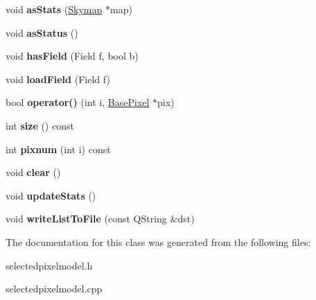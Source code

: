 \begin{DoxyCompactItemize}
\item 
\hypertarget{classSelectedPixelModel_addf41ff364fd45d5722afb7de6f5f29d}{
void {\bfseries asStats} (\hyperlink{classSkymap}{Skymap} $\ast$map)}
\label{classSelectedPixelModel_addf41ff364fd45d5722afb7de6f5f29d}

\item 
\hypertarget{classSelectedPixelModel_a06ae43060ce7a65f898454bd20181c96}{
void {\bfseries asStatus} ()}
\label{classSelectedPixelModel_a06ae43060ce7a65f898454bd20181c96}

\item 
\hypertarget{classSelectedPixelModel_a5dc32e7fcbfc6df118467e70cae393a8}{
void {\bfseries hasField} (Field f, bool b)}
\label{classSelectedPixelModel_a5dc32e7fcbfc6df118467e70cae393a8}

\item 
\hypertarget{classSelectedPixelModel_abbd5474de647e66af0d33852435160d0}{
void {\bfseries loadField} (Field f)}
\label{classSelectedPixelModel_abbd5474de647e66af0d33852435160d0}

\item 
\hypertarget{classSelectedPixelModel_adecd68d77b566ba1a424bcef30661979}{
bool {\bfseries operator()} (int i, \hyperlink{classBasePixel}{BasePixel} $\ast$pix)}
\label{classSelectedPixelModel_adecd68d77b566ba1a424bcef30661979}

\item 
\hypertarget{classSelectedPixelModel_a7ec3e004ed05463a8fc71592b25a77bb}{
int {\bfseries size} () const }
\label{classSelectedPixelModel_a7ec3e004ed05463a8fc71592b25a77bb}

\item 
\hypertarget{classSelectedPixelModel_a1e11c3dfea81238c596cf94442dba9dd}{
int {\bfseries pixnum} (int i) const }
\label{classSelectedPixelModel_a1e11c3dfea81238c596cf94442dba9dd}

\item 
\hypertarget{classSelectedPixelModel_ad22aeecdd2734ec861999ba6208c89de}{
void {\bfseries clear} ()}
\label{classSelectedPixelModel_ad22aeecdd2734ec861999ba6208c89de}

\item 
\hypertarget{classSelectedPixelModel_a5d4ee1fa2d0962f9c48dfff9d584c5fa}{
void {\bfseries updateStats} ()}
\label{classSelectedPixelModel_a5d4ee1fa2d0962f9c48dfff9d584c5fa}

\item 
\hypertarget{classSelectedPixelModel_ab987ac5a6ed821e33a28829e35c6cb40}{
void {\bfseries writeListToFile} (const QString \&dst)}
\label{classSelectedPixelModel_ab987ac5a6ed821e33a28829e35c6cb40}

\end{DoxyCompactItemize}


The documentation for this class was generated from the following files:\begin{DoxyCompactItemize}
\item 
selectedpixelmodel.h\item 
selectedpixelmodel.cpp\end{DoxyCompactItemize}

